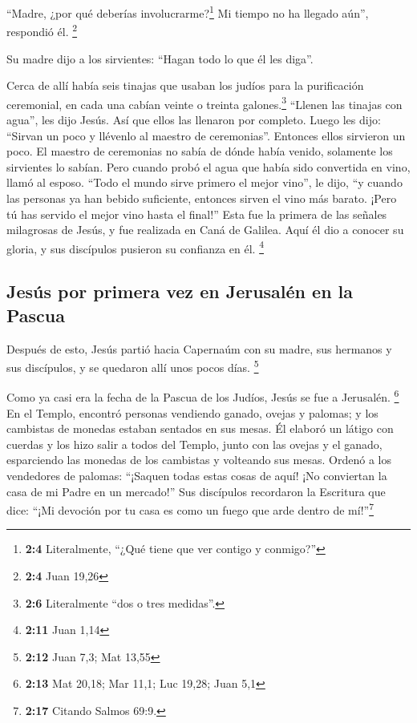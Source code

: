  ``Madre, ¿por qué deberías involucrarme?\footnote{\textbf{2:4}
  Literalmente, ``¿Qué tiene que ver contigo y conmigo?''} Mi tiempo no
ha llegado aún'', respondió él. \footnote{\textbf{2:4} Juan 19,26}

 Su madre dijo a los sirvientes: ``Hagan todo lo que él
les diga''.

 Cerca de allí había seis tinajas que usaban los judíos
para la purificación ceremonial, en cada una cabían veinte o treinta
galones.\footnote{\textbf{2:6} Literalmente ``dos o tres medidas''.}
 ``Llenen las tinajas con agua'', les dijo Jesús. Así que
ellos las llenaron por completo.  Luego les dijo: ``Sirvan
un poco y llévenlo al maestro de ceremonias''. Entonces ellos sirvieron
un poco.  El maestro de ceremonias no sabía de dónde había
venido, solamente los sirvientes lo sabían. Pero cuando probó el agua
que había sido convertida en vino, llamó al esposo. 
``Todo el mundo sirve primero el mejor vino'', le dijo, ``y cuando las
personas ya han bebido suficiente, entonces sirven el vino más barato.
¡Pero tú has servido el mejor vino hasta el final!'' 
Esta fue la primera de las señales milagrosas de Jesús, y fue realizada
en Caná de Galilea. Aquí él dio a conocer su gloria, y sus discípulos
pusieron su confianza en él. \footnote{\textbf{2:11} Juan 1,14}

\hypertarget{jesuxfas-por-primera-vez-en-jerusaluxe9n-en-la-pascua}{%
\subsection{Jesús por primera vez en Jerusalén en la
Pascua}\label{jesuxfas-por-primera-vez-en-jerusaluxe9n-en-la-pascua}}

 Después de esto, Jesús partió hacia Capernaúm con su
madre, sus hermanos y sus discípulos, y se quedaron allí unos pocos
días. \footnote{\textbf{2:12} Juan 7,3; Mat 13,55}

 Como ya casi era la fecha de la Pascua de los Judíos,
Jesús se fue a Jerusalén. \footnote{\textbf{2:13} Mat 20,18; Mar 11,1;
  Luc 19,28; Juan 5,1}  En el Templo, encontró personas
vendiendo ganado, ovejas y palomas; y los cambistas de monedas estaban
sentados en sus mesas.  Él elaboró un látigo con cuerdas
y los hizo salir a todos del Templo, junto con las ovejas y el ganado,
esparciendo las monedas de los cambistas y volteando sus mesas.
 Ordenó a los vendedores de palomas: ``¡Saquen todas
estas cosas de aquí! ¡No conviertan la casa de mi Padre en un mercado!''
 Sus discípulos recordaron la Escritura que dice: ``¡Mi
devoción por tu casa es como un fuego que arde dentro de
mí!''\footnote{\textbf{2:17} Citando Salmos 69:9.}

